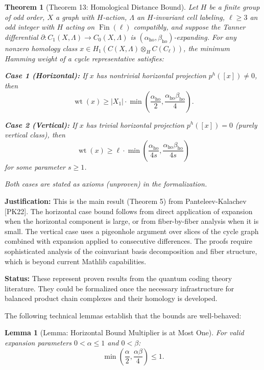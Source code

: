 \documentclass[11pt]{article}
\theoremstyle{plain}
\newtheorem*{theorem}{Theorem}
\newtheorem*{lemma}{Lemma}
\theoremstyle{definition}
\theoremstyle{remark}
\begin{document}
\begin{theorem}[Theorem 13: Homological Distance Bound]
Let $H$ be a finite group of odd order, $X$ a graph with $H$-action, $\Lambda$ an $H$-invariant cell labeling, $\ell \geq 3$ an odd integer with $H$ acting on $\operatorname{Fin}(\ell)$ compatibly, and suppose the Tanner differential $\partial : C_1(X, \Lambda) \to C_0(X, \Lambda)$ is $(\alpha_{\text{ho}}, \beta_{\text{ho}})$-expanding. For any nonzero homology class $x \in H_1(C(X,\Lambda) \otimes_H C(C_\ell))$, the minimum Hamming weight of a cycle representative satisfies:

\textbf{Case 1 (Horizontal):} If $x$ has nontrivial horizontal projection $p^h([x]) \neq 0$, then
\[
\operatorname{wt}(x) \geq |X_1| \cdot \min\!\left(\frac{\alpha_{\text{ho}}}{2}, \frac{\alpha_{\text{ho}} \beta_{\text{ho}}}{4}\right).
\]

\textbf{Case 2 (Vertical):} If $x$ has trivial horizontal projection $p^h([x]) = 0$ (purely vertical class), then
\[
\operatorname{wt}(x) \geq \ell \cdot \min\!\left(\frac{\alpha_{\text{ho}}}{4s}, \frac{\alpha_{\text{ho}} \beta_{\text{ho}}}{4s}\right)
\]
for some parameter $s \geq 1$.

\textit{Both cases are stated as axioms (unproven) in the formalization.}
\end{theorem}

\textbf{Justification:} This is the main result (Theorem 5) from Panteleev-Kalachev [PK22]. The horizontal case bound follows from direct application of expansion when the horizontal component is large, or from fiber-by-fiber analysis when it is small. The vertical case uses a pigeonhole argument over slices of the cycle graph combined with expansion applied to consecutive differences. The proofs require sophisticated analysis of the coinvariant basis decomposition and fiber structure, which is beyond current Mathlib capabilities.

\textbf{Status:} These represent proven results from the quantum coding theory literature. They could be formalized once the necessary infrastructure for balanced product chain complexes and their homology is developed.

The following technical lemmas establish that the bounds are well-behaved:

\begin{lemma}[Lemma: Horizontal Bound Multiplier is at Most One]
For valid expansion parameters $0 < \alpha \leq 1$ and $0 < \beta$:
\[
\min\!\left(\frac{\alpha}{2}, \frac{\alpha\beta}{4}\right) \leq 1.
\]
\end{lemma}
\end{document}

